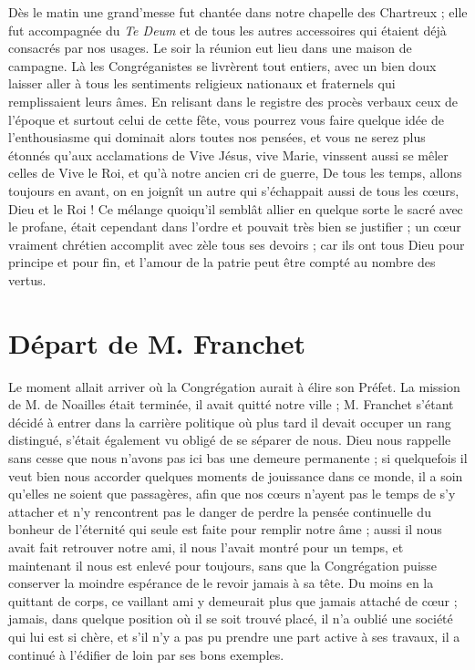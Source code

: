 Dès le matin une grand'messe fut chantée dans notre chapelle des Chartreux ; elle fut accompagnée du \textit{Te Deum} et de tous les autres accessoires qui étaient déjà consacrés par nos usages. Le soir la réunion eut lieu dans une maison de campagne. Là les Congréganistes se livrèrent tout entiers, avec un bien doux laisser aller à tous les sentiments religieux
nationaux et fraternels qui remplissaient leurs âmes. En relisant dans le registre des procès verbaux ceux de l'époque et surtout celui de cette fête, vous pourrez vous faire quelque idée de l'enthousiasme qui dominait alors toutes nos pensées, et vous ne serez plus étonnés qu'aux acclamations de Vive Jésus, vive Marie, vinssent aussi se mêler celles de Vive le Roi, et qu'à notre ancien cri de guerre, De tous les temps, allons toujours en avant, on en joignît un autre qui s'échappait aussi de tous les cœurs, Dieu et le Roi ! Ce mélange quoiqu'il semblât allier en quelque sorte le sacré avec le profane, était cependant dans l'ordre et pouvait très bien se justifier ; un cœur vraiment chrétien accomplit avec zèle tous ses devoirs ; car ils ont tous Dieu pour principe et pour fin, et l'amour de la patrie peut être compté au nombre des vertus.

\section*{Départ de M. Franchet}
Le moment allait arriver où la Congrégation aurait à élire son Préfet. La mission de M. de Noailles était terminée, il avait quitté notre ville ; M. Franchet s'étant décidé à entrer dans la carrière politique où plus tard il devait occuper un rang distingué, s'était également vu obligé de se séparer de nous. Dieu nous rappelle sans cesse que nous n'avons pas ici bas une demeure permanente ; si quelquefois il veut bien nous accorder quelques moments de jouissance dans ce monde, il a soin qu'elles ne soient que passagères, afin que nos cœurs n'ayent pas le temps de s'y attacher et n'y rencontrent pas le danger de perdre la pensée continuelle du bonheur de l'éternité qui seule est faite pour remplir notre âme ; aussi il nous avait fait retrouver notre ami, il nous l'avait montré pour un temps, et maintenant il
nous est enlevé pour toujours, sans que la Congrégation puisse conserver la moindre espérance de le revoir jamais à sa tête. Du moins en la quittant de corps, ce vaillant ami y demeurait plus que jamais attaché de cœur ; jamais, dans quelque position où il se soit trouvé placé, il n'a oublié une société qui lui est si chère, et s'il n'y a pas pu prendre une part active à ses travaux, il a continué à l'édifier de loin par ses bons exemples.


